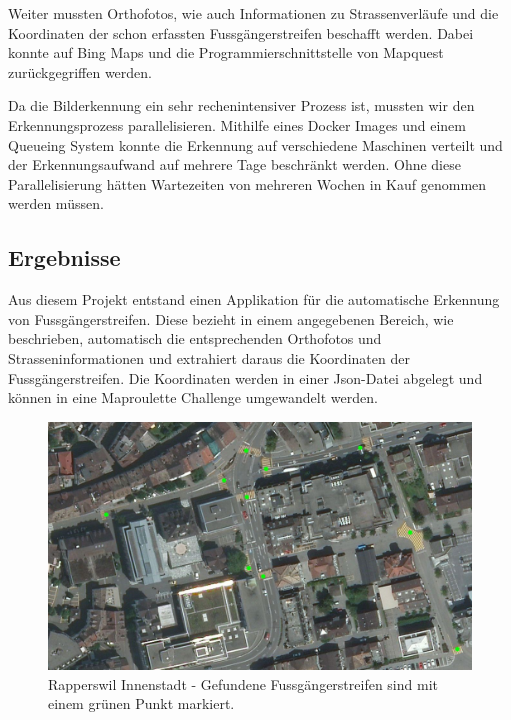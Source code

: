 Weiter mussten Orthofotos, wie auch Informationen zu Strassenverläufe und die Koordinaten der schon erfassten Fussgängerstreifen beschafft werden. Dabei konnte auf Bing Maps und die Programmierschnittstelle von Mapquest zurückgegriffen werden.

Da die Bilderkennung ein sehr rechenintensiver Prozess ist, mussten wir den Erkennungsprozess parallelisieren. Mithilfe eines Docker Images und einem Queueing System konnte die Erkennung auf verschiedene Maschinen verteilt und der Erkennungsaufwand auf mehrere Tage beschränkt werden. Ohne diese Parallelisierung hätten Wartezeiten von mehreren Wochen in Kauf genommen werden müssen.


\subsection*{Ergebnisse}
Aus diesem Projekt entstand einen Applikation für die automatische Erkennung von Fussgängerstreifen. Diese bezieht in einem angegebenen Bereich, wie beschrieben, automatisch die entsprechenden Orthofotos und Strasseninformationen und extrahiert daraus die Koordinaten der Fussgängerstreifen. Die Koordinaten werden in einer Json-Datei abgelegt und können in eine Maproulette Challenge umgewandelt werden. 
\\
\begin{figure}[H]
	\centering
	\includegraphics[width=\textwidth -10mm]{images/boxsave_rappi.png}
	\caption[Überblick]{Rapperswil Innenstadt - Gefundene Fussgängerstreifen sind mit einem grünen Punkt markiert.}
\end{figure}

